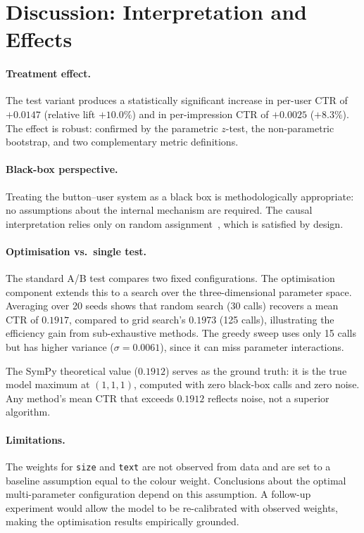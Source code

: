 \documentclass[a4paper,12pt]{extarticle}
\numberwithin{equation}{section}
\begin{document}
\clearpage

\section*{Discussion: Interpretation and Effects}

\paragraph{Treatment effect.} The test variant produces a statistically
significant increase in per-user CTR of $+0.0147$ (relative lift
$+10.0\%$) and in per-impression CTR of $+0.0025$ ($+8.3\%$). The effect
is robust: confirmed by the parametric $z$-test, the non-parametric
bootstrap, and two complementary metric definitions.

\paragraph{Black-box perspective.} Treating the button--user system as a
black box is methodologically appropriate: no assumptions about the internal
mechanism are required. The causal interpretation relies only on random
assignment~\cite{rubin1999teaching}, which is satisfied by design.

\paragraph{Optimisation vs.\ single test.} The standard A/B test compares
two fixed configurations. The optimisation component extends this to a
search over the three-dimensional parameter space. Averaging over 20 seeds
shows that random search (30 calls) recovers a mean CTR of $0.1917$,
compared to grid search's $0.1973$ (125 calls), illustrating the
efficiency gain from sub-exhaustive methods. The greedy sweep uses only
15 calls but has higher variance ($\sigma = 0.0061$), since it can miss
parameter interactions.

The SymPy theoretical value ($0.1912$) serves as the ground truth: it is
the true model maximum at $(1,1,1)$, computed with zero black-box calls and
zero noise. Any method's mean CTR that exceeds $0.1912$ reflects
noise, not a superior algorithm.

\paragraph{Limitations.} The weights for \texttt{size} and \texttt{text}
are not observed from data and are set to a baseline assumption equal to
the colour weight. Conclusions about the optimal multi-parameter
configuration depend on this assumption. A follow-up experiment would
allow the model to be re-calibrated with observed weights, making the
optimisation results empirically grounded.
\end{document}
